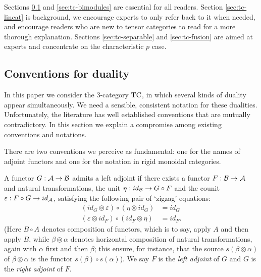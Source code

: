 \documentclass{amsart}
\begin{document}
Sections \ref{sec:conventions} and \ref{sec:tc-bimodules} are essential for all readers.  Section \ref{sec:tc-lincat} is background, we encourage experts to only refer back to it when needed, and encourage readers who are new to tensor categories to read \cite{BTP} for a more thorough explanation.  Sections \ref{sec:tc-separable} and \ref{sec:tc-fusion} are aimed at experts and  concentrate on the characteristic $p$ case.   

\subsection{Conventions for duality} \label{sec:conventions}

In this paper we consider the 3-category $\mathrm{TC}$, in which several kinds of duality appear simultaneously. We need a sensible, consistent notation for these dualities.  Unfortunately, the literature has well established conventions that are mutually contradictory.  In this section we explain a compromise among existing conventions and notations.

There are two conventions we perceive as fundamental: one for the names of adjoint functors and one for the notation in rigid monoidal categories. 

\begin{definition} \label{def:Adjoints}
	A functor $G: \mathcal A \to \mathcal B$  admits a left adjoint if there exists a functor $F: \mathcal B \to \mathcal A$ and natural transformations, the  unit $\eta: id_{\mathcal B} \to G \circ F$ and the  counit $\varepsilon: F \circ G \to id_{\mathcal A}$, satisfying the following pair of `zigzag' equations:
	\begin{align*}
		(id_{G} \circledcirc \varepsilon  ) \circ (  \eta \circledcirc id_{G}) &= id_{G} \\
		(\varepsilon \circledcirc id_{F}) \circ (id_{F} \circledcirc \eta) &= id_{F}.
	\end{align*}
(Here $B \circ A$ denotes composition of functors, which is to say, apply $A$ and then apply $B$, while $\beta \circledcirc \alpha$ denotes horizontal composition of natural transformations, again with $\alpha$ first and then $\beta$; this ensure, for instance, that the source $s(\beta \circledcirc \alpha)$ of $\beta \circledcirc \alpha$ is the functor $s(\beta) \circ s(\alpha)$).  We say $F$ is the {\em left adjoint} of $G$ and $G$ is the {\em right adjoint} of $F$.
\end{definition}
\end{document}
